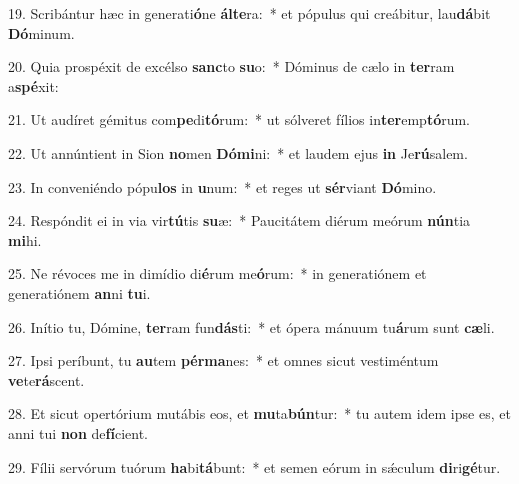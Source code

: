 19. Scribántur hæc in generati\textbf{ó}ne \textbf{ál}\textbf{te}ra:~*  et pópulus qui creábitur, lau\textbf{dá}bit \textbf{Dó}minum.\

20. Quia prospéxit de excélso \textbf{sanc}to \textbf{su}o:~*  Dóminus de cælo in \textbf{ter}ram a\textbf{spé}xit:\

21. Ut audíret gémitus com\textbf{pe}di\textbf{tó}rum:~*  ut sólveret fílios in\textbf{ter}emp\textbf{tó}rum.\

22. Ut annúntient in Sion \textbf{no}men \textbf{Dó}\textbf{mi}ni:~*  et laudem ejus \textbf{in} Je\textbf{rú}salem.\

23. In conveniéndo pópu\textbf{los} in \textbf{u}num:~*  et reges ut \textbf{sér}viant \textbf{Dó}mino.\

24. Respóndit ei in via vir\textbf{tú}tis \textbf{su}æ:~*  Paucitátem diérum meórum \textbf{nún}tia \textbf{mi}hi.\

25. Ne révoces me in dimídio di\textbf{é}rum me\textbf{ó}rum:~*  in generatiónem et generatiónem \textbf{an}ni \textbf{tu}i.\

26. Inítio tu, Dómine, \textbf{ter}ram fun\textbf{dás}ti:~*  et ópera mánuum tu\textbf{á}rum sunt \textbf{cæ}li.\

27. Ipsi períbunt, tu \textbf{au}tem \textbf{pér}\textbf{ma}nes:~*  et omnes sicut vestiméntum \textbf{ve}te\textbf{rá}scent.\

28. Et sicut opertórium mutábis eos, et \textbf{mu}ta\textbf{bún}tur:~*  tu autem idem ipse es, et anni tui \textbf{non} de\textbf{fí}cient.\

29. Fílii servórum tuórum \textbf{ha}bi\textbf{tá}bunt:~*  et semen eórum in sǽculum \textbf{di}ri\textbf{gé}tur.\

